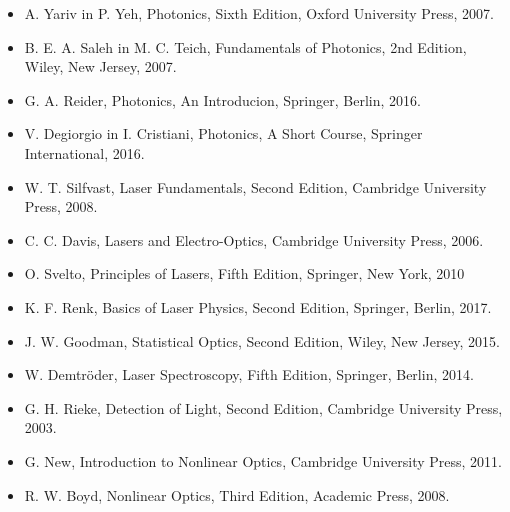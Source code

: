 \documentclass[11pt,fleqn]{book} %
\begin{document}
\begin{itemize}
\setlength\itemsep{0.5em}
 \item A. Yariv in P. Yeh, Photonics, Sixth Edition, Oxford University Press, 2007.
 \item B. E. A. Saleh in M. C. Teich, Fundamentals of Photonics, 2nd Edition, Wiley, New Jersey, 2007. 
 \item G. A. Reider, Photonics, An Introducion, Springer, Berlin, 2016.
\item V. Degiorgio in I. Cristiani, Photonics, A Short Course, Springer International, 2016.
 \item W. T. Silfvast, Laser Fundamentals, Second Edition, Cambridge University Press, 2008. 
 \item C. C. Davis, Lasers and Electro-Optics, Cambridge University Press, 2006.
 \item O. Svelto, Principles of Lasers, Fifth Edition, Springer, New York, 2010
 \item K. F. Renk, Basics of Laser Physics, Second Edition, Springer, Berlin, 2017.
 \item J. W. Goodman, Statistical Optics, Second Edition, Wiley, New Jersey, 2015.
 \item W. Demtr\"oder, Laser Spectroscopy, Fifth Edition, Springer, Berlin, 2014.
 \item G. H. Rieke, Detection of Light, Second Edition, Cambridge University Press, 2003.
  \item G. New, Introduction to Nonlinear Optics, Cambridge University Press, 2011.
 \item R. W. Boyd, Nonlinear Optics, Third Edition, Academic Press, 2008.
\end{itemize}









\end{document}
